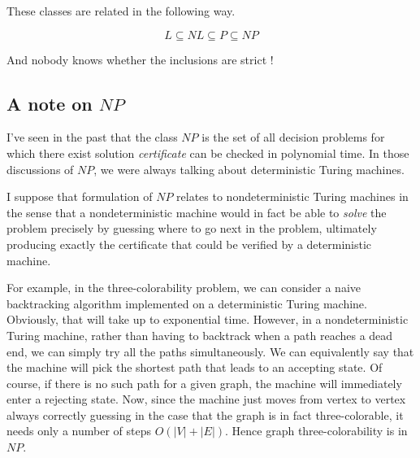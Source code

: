 These classes are related in the following way.

$$
L \subseteq NL \subseteq P \subseteq NP
$$

And nobody knows whether the inclusions are strict !

\subsection{A note on $NP$}

I've seen in the past that the class $NP$ is the set of all decision problems
for which there exist solution \emph{certificate} can be checked in polynomial
time. In those discussions of $NP$, we were always talking about deterministic
Turing machines. 

I suppose that formulation of $NP$ relates to nondeterministic Turing machines
in the sense that a nondeterministic machine would in fact be able to
\emph{solve} the problem precisely by guessing where to go next in the problem,
ultimately producing exactly the certificate that could be verified by a
deterministic machine.

For example, in the three-colorability problem, we can consider a naive
backtracking algorithm implemented on a deterministic Turing machine.
Obviously, that will take up to exponential time. However, in a
nondeterministic Turing machine, rather than having to backtrack when a path
reaches a dead end, we can simply try all the paths simultaneously. We can
equivalently say that the machine will pick the shortest path that leads to an
accepting state. Of course, if there is no such path for a given graph, the
machine will immediately enter a rejecting state. Now, since the machine just
moves from vertex to vertex always correctly guessing in the case that the
graph is in fact three-colorable, it needs only a number of steps $O(|V| +
|E|)$. Hence graph three-colorability is in $NP$.
